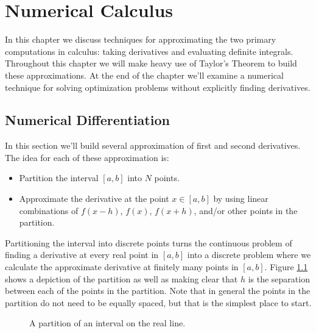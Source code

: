 \chapter{Numerical Calculus}
In this chapter we discuss techniques for approximating the two primary computations
in calculus: taking derivatives and evaluating definite integrals. Throughout this chapter
we will make heavy use of Taylor's Theorem to build these approximations. At the end of
the chapter we'll examine a numerical technique for solving optimization problems without
explicitly finding derivatives. 

\section{Numerical Differentiation}
In this section we'll build several approximation of first and second derivatives.  The
idea for each of these approximation is:
\begin{itemize}
    \item Partition the interval $[a,b]$ into $N$ points.
    \item Approximate the derivative at the point $x \in [a,b]$ by using linear
        combinations of $f(x-h)$, $f(x)$, $f(x+h)$, and/or other points in the partition.  
\end{itemize}
Partitioning the interval into discrete points turns the continuous problem of finding a
derivative at every real point in $[a,b]$ into a discrete
problem where we calculate the approximate derivative at finitely many points in $[a,b]$.
Figure \ref{fig:differentiation_partition} shows a depiction of the partition as well as
making clear that $h$ is the separation between each of the points in the partition.  Note
that in general the points in the partition do not need to be equally spaced, but that is
the simplest place to start.
\begin{figure}[ht!]
    \begin{center}
    \end{center}
    \caption{A partition of an interval on the real line.}
    \label{fig:differentiation_partition}
\end{figure}

